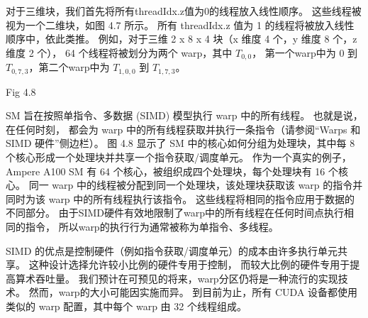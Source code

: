 对于三维块，我们首先将所有threadIdx.z值为0的线程放入线性顺序。 这些线程被视为一个二维块，如图 4.7 所示。 
所有 threadIdx.z 值为 1 的线程将被放入线性顺序中，依此类推。 
例如，对于三维 2 x 8 x 4 块（x 维度 4 个，y 维度 8 个，z 维度 2 个），
64 个线程将被划分为两个 warp，其中 $T_{0,0}$， 
第一个warp中为 0 到 $T_{0,7,3}$，第二个warp中为 $T_{1,0,0}$ 到 $T_{1,7,3}$。

{\color{red} Fig 4.8}

SM 旨在按照单指令、多数据 (SIMD) 模型执行 warp 中的所有线程。 也就是说，在任何时刻，
都会为 warp 中的所有线程获取并执行一条指令（请参阅“Warps 和 SIMD 硬件”侧边栏）。 
图 4.8 显示了 SM 中的核心如何分组为处理块，其中每 8 个核心形成一个处理块并共享一个指令获取/调度单元。 
作为一个真实的例子，Ampere A100 SM 有 64 个核心，被组织成四个处理块，每个处理块有 16 个核心。 
同一 warp 中的线程被分配到同一个处理块，该处理块获取该 warp 的指令并同时为该 warp 中的所有线程执行该指令。 
这些线程将相同的指令应用于数据的不同部分。 由于SIMD硬件有效地限制了warp中的所有线程在任何时间点执行相同的指令，
所以warp的执行行为通常被称为单指令、多线程。

SIMD 的优点是控制硬件（例如指令获取/调度单元）的成本由许多执行单元共享。 这种设计选择允许较小比例的硬件专用于控制，
而较大比例的硬件专用于提高算术吞吐量。 我们预计在可预见的将来，warp分区仍将是一种流行的实现技术。 
然而，warp的大小可能因实施而异。 到目前为止，所有 CUDA 设备都使用类似的 warp 配置，其中每个 warp 由 32 个线程组成。

